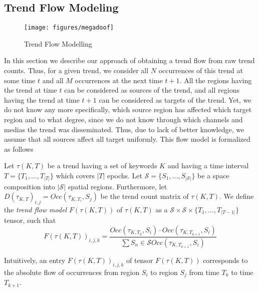 \subsection{Trend Flow Modeling}
\begin{figure}[t] \centering \texttt{[image: figures/megadoof]}
    \caption{Trend Flow Modelling}
    \label{fig:megadoof}
    \vspace{-0em}
\end{figure}
In this section we describe our approach of obtaining a trend flow from raw
trend counts. Thus, for a given trend, we consider all $N$ occurrences of this
trend at some time $t$ and all $M$ occurrences at the next time $t+1$. All the
regions having the trend at time $t$ can be considered as sources of the trend,
and all regions having the trend at time $t+1$ can be considered as targets of
the trend. Yet, we do not know any more specifically, which source region has
affected which target region and to what degree, since we do not know through
which channels and medias the trend was disseminated. Thus, due to lack of
better knowledge, we assume that all sources affect all target uniformly. This
flow model is formalized as follows
\begin{definition}\label{def:tensor}
Let $\tau(K,T)$ be a trend having a set of keywords $K$ and having a time interval $T=\{T_1,...,T_{|T|}\}$ which covers $|T|$ epochs. Let $\mathcal{S}=\{S_1,...,S_{|\mathcal{S}|}\}$ be a space composition into $|\mathcal{S}|$ spatial regions. 
Furthermore, let $D(\tau_{K,T})_{i,j}=Occ(\tau_{K,T_i},S_j)$ be the trend count matrix of $\tau(K,T)$. We define the \emph{trend flow model} $F(\tau(K,T))$ of $\tau(K,T)$ as a $\mathcal{S}\times\mathcal{S}\times \{T_1,...,T_{|T-1|}\}$ tensor, such that
$$
F(\tau(K,T))_{i,j,k}=\frac{Occ(\tau_{K,T_k},S_i)\cdot Occ(\tau_{K,T_{k+1}},S_i)}{\sum{S_n\in\mathcal{S}}Occ(\tau_{K,T_{k+1}},S_i)}
$$
\end{definition}
Intuitively, an entry $F(\tau(K,T))_{i,j,k}$ of tensor $F(\tau(K,T))$ corresponds to the absolute flow of occurrences from region $S_i$ to region $S_j$ from time $T_k$ to time $T_{k+1}$. 
